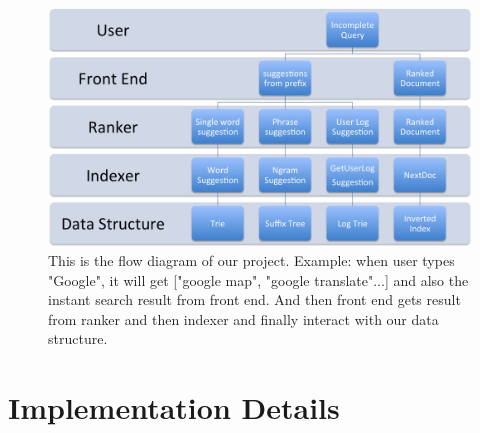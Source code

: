 \documentclass{article}
\begin{document}
\begin{figure}
\centering
\setlength\fboxrule{0.5pt}
\includegraphics[scale=0.6] {WorkFlow.png}
\caption{This is the flow diagram of our project. Example: when user types "Google", it will get ["google map", "google translate"...] and also the instant search result from front end. And then front end gets result from ranker and then indexer and finally interact with our data structure.}
\label{fig:WorkFlow.png}
\end{figure}

\section{Implementation Details}
\end{document}
